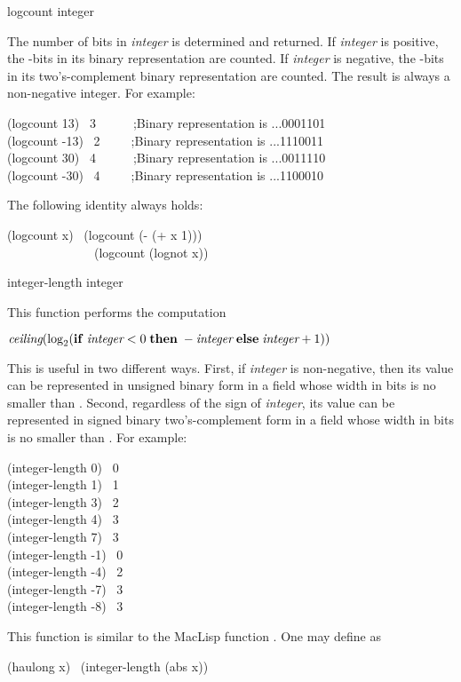 \begin{defun}[Function]
logcount integer

The number of bits in \emph{integer} is determined and returned.
If \emph{integer} is positive, the -bits in its binary
representation are counted.  If \emph{integer} is negative,
the -bits in its two's-complement binary representation are counted.
The result is always a non-negative integer.
For example:
\begin{lisp}
(logcount 13) \EV\ 3~~~~~~;\textrm{Binary representation is} ...0001101 \\
(logcount -13) \EV\ 2~~~~~;\textrm{Binary representation is} ...1110011 \\
(logcount 30) \EV\ 4~~~~~~;\textrm{Binary representation is} ...0011110 \\
(logcount -30) \EV\ 4~~~~~;\textrm{Binary representation is} ...1100010
\end{lisp}
The following identity always holds:
\begin{lisp}
(logcount x) \EQ\ (logcount (- (+ x 1))) \\
~~~~~~~~~~~~~\EQ\ (logcount (lognot x))
\end{lisp}
\end{defun}

\begin{defun}[Function]
integer-length integer

This function performs the computation
\begin{tabbing}
$ \emph{ceiling}(\log_2 ({\bf if}\; \emph{integer} < 0 \;{\bf then} \;
    -\emph{integer} \;{\bf else}\; \emph{integer}+1)) $
\end{tabbing}
This is useful in two different ways.
First, if \emph{integer} is non-negative, then its value can be represented
in unsigned binary form in a field whose width in bits is
no smaller than .
Second, regardless of the sign of \emph{integer}, its value can be
represented in signed binary two's-complement form in a field
whose width in bits is no smaller than .
For example:
\begin{lisp}
(integer-length 0) \EV\ 0 \\
(integer-length 1) \EV\ 1 \\
(integer-length 3) \EV\ 2 \\
(integer-length 4) \EV\ 3 \\
(integer-length 7) \EV\ 3 \\
(integer-length -1) \EV\ 0 \\
(integer-length -4) \EV\ 2 \\
(integer-length -7) \EV\ 3 \\
(integer-length -8) \EV\ 3
\end{lisp}

\beforenoterule
\begin{incompatibility}
This function is similar to the MacLisp
function .  One may define  as
\begin{lisp}
(haulong x) \EQ\ (integer-length (abs x))
\end{lisp}
\end{incompatibility}
\afternoterule
\end{defun}


